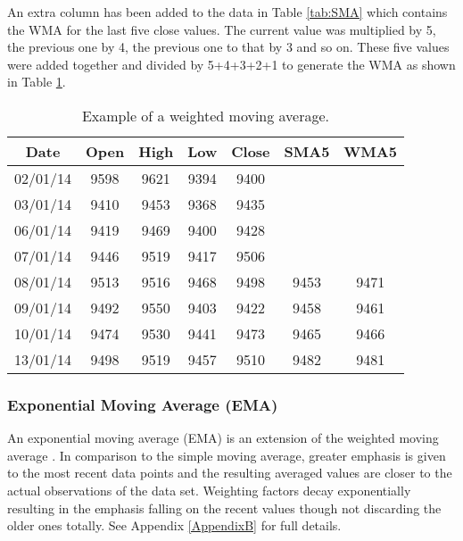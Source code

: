 An extra column has been added to the data in Table \ref{tab:SMA} which contains the WMA for the last five close values. The current value was multiplied by 5, the previous one by 4, the previous one to that by 3 and so on. These five values were added together and divided by 5+4+3+2+1 to generate the WMA as shown in Table \ref{tab:WMA}.

\begin{table}[htbp]
  \centering
  \caption[Example of a Weighted Moving Average]{Example of a weighted moving average.}
    \begin{tabular}{ccccccc}
    \toprule
    \textbf{Date} & \textbf{Open} & \textbf{High} & \textbf{Low} & \textbf{Close} & \textbf{SMA5} & \textbf{WMA5} \\
    \midrule
    02/01/14 & 9598  & 9621  & 9394  & 9400  &       &  \\
    03/01/14 & 9410  & 9453  & 9368  & 9435  &       &  \\
    06/01/14 & 9419  & 9469  & 9400  & 9428  &       &  \\
    07/01/14 & 9446  & 9519  & 9417  & 9506  &       &  \\
    08/01/14 & 9513  & 9516  & 9468  & 9498  & 9453  & 9471 \\
    09/01/14 & 9492  & 9550  & 9403  & 9422  & 9458  & 9461 \\
    10/01/14 & 9474  & 9530  & 9441  & 9473  & 9465  & 9466 \\
    13/01/14 & 9498  & 9519  & 9457  & 9510  & 9482  & 9481 \\
    \bottomrule
    \end{tabular}%
  \label{tab:WMA}%
\end{table}%

\subsubsection{Exponential Moving Average (EMA)}
An exponential moving average (EMA) is an extension of the weighted moving average \citep{Ord20041}. In comparison to the simple moving average, greater emphasis is given to the most recent data points and the resulting averaged values are closer to the actual observations of the data set. Weighting factors decay exponentially resulting in the emphasis falling on the recent values though not discarding the older ones totally. See Appendix \ref{AppendixB} for full details.

